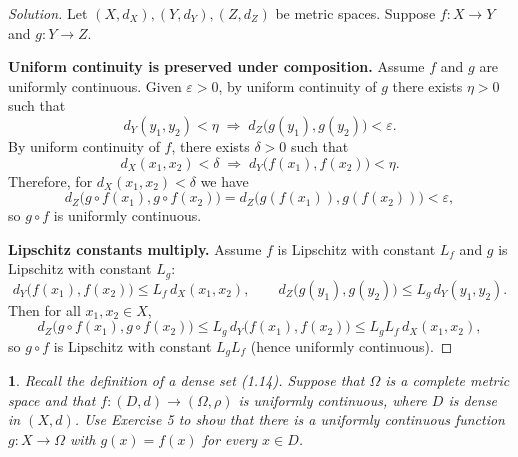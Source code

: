 \documentclass[12pt, a4paper]{report}
\theoremstyle{spaced}
\newtheorem{exercise}{}
\newcommand{\setexercise}[1]{\setcounter{exercise}{#1-1}}
\begin{document}
\begin{proof}[Solution]
	Let $(X,d_X),(Y,d_Y),(Z,d_Z)$ be metric spaces.
	Suppose $f:X\to Y$ and $g:Y\to Z$.

	\medskip
	\noindent\textbf{Uniform continuity is preserved under composition.}
	Assume $f$ and $g$ are uniformly continuous.
	Given $\varepsilon>0$, by uniform continuity of $g$ there exists $\eta>0$ such that
	\[
		d_Y(y_1,y_2)<\eta \;\Longrightarrow\; d_Z\bigl(g(y_1),g(y_2)\bigr)<\varepsilon.
	\]
	By uniform continuity of $f$, there exists $\delta>0$ such that
	\[
		d_X(x_1,x_2)<\delta \;\Longrightarrow\; d_Y\bigl(f(x_1),f(x_2)\bigr)<\eta.
	\]
	Therefore, for $d_X(x_1,x_2)<\delta$ we have
	\[
		d_Z\bigl(g\!\circ f(x_1),g\!\circ f(x_2)\bigr)
		= d_Z\bigl(g(f(x_1)),g(f(x_2))\bigr) < \varepsilon,
	\]
	so $g\circ f$ is uniformly continuous.

	\medskip
	\noindent\textbf{Lipschitz constants multiply.}
	Assume $f$ is Lipschitz with constant $L_f$ and $g$ is Lipschitz with constant $L_g$:
	\[
		d_Y\bigl(f(x_1),f(x_2)\bigr)\le L_f\,d_X(x_1,x_2),\qquad
		d_Z\bigl(g(y_1),g(y_2)\bigr)\le L_g\,d_Y(y_1,y_2).
	\]
	Then for all $x_1,x_2\in X$,
	\[
		d_Z\bigl(g\!\circ f(x_1),g\!\circ f(x_2)\bigr)
		\le L_g\,d_Y\bigl(f(x_1),f(x_2)\bigr)
		\le L_g L_f\, d_X(x_1,x_2),
	\]
	so $g\circ f$ is Lipschitz with constant $L_gL_f$ (hence uniformly continuous).
\end{proof}

\setexercise{6}
\begin{exercise}
	Recall the definition of a dense set (1.14). Suppose that $\Omega$ is a complete metric space
	and that $f : (D, d) \to (\Omega, \rho)$ is uniformly continuous, where $D$ is dense in $(X, d)$.
	Use Exercise 5 to show that there is a uniformly continuous function
	$g : X \to \Omega$ with $g(x) = f(x)$ for every $x \in D$.
\end{exercise}
\end{document}
